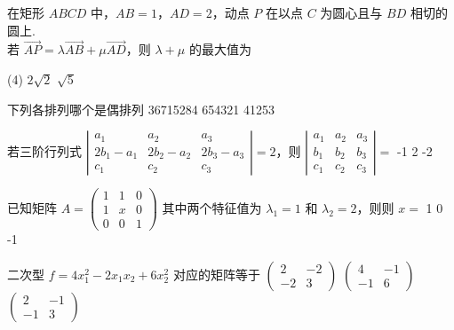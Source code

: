 \begin{question}
在矩形 $ABCD$ 中，$AB=1$，$AD=2$，动点 $P$ 在以点 $C$ 为圆心且与 $BD$ 相切的圆上.\\
	若 $\overrightarrow{{AP}}=\lambda\overrightarrow{{AB} }+\mu\overrightarrow{{AD}}$，则 $\lambda+\mu$ 的最大值为
	\begin{tasks}(4)
		 \task $2\sqrt{2}$ \task $\sqrt{5}$ 
	\end{tasks}
\end{question}

\begin{question}
下列各排列哪个是偶排列 
	{36715284}
	{654321}
	{41253}
\end{question}



\begin{question}
若三阶行列式 $\left|\begin{array}{ccc}
  a_1 & a_2 & a_3\\
  2 b_1 - a_1 & 2 b_2 - a_2 & 2 b_3 - a_3\\
  c_1 & c_2 & c_3
\end{array}\right| = 2$，则 $\left|\begin{array}{ccc}
  a_1 & a_2 & a_3\\
  b_1 & b_2 & b_3\\
  c_1 & c_2 & c_3
\end{array}\right|=$ 
	{-1}
	{2}
	{-2}
\end{question}



\begin{question}
已知矩阵 $A = \left(\begin{array}{ccc}
  1 & 1 & 0\\
  1 & x & 0\\
  0 & 0 & 1
\end{array}\right)$ 其中两个特征值为 $\lambda_1 = 1$ 和 $\lambda_2
= 2$，则则 $x=$ 
	{1}
	{0}
	{-1}
\end{question}


\begin{question}
二次型 $f = 4 x_1^2 - 2 x_1 x_2 + 6 x_2^2$ 对应的矩阵等于 
	{$\left(\begin{array}{cc}
  2 & - 2\\
  - 2 & 3
\end{array}\right)$}
	{$\left(\begin{array}{cc}
  4 & - 1\\
  - 1 & 6
\end{array}\right)$}
	{$\left(\begin{array}{cc}
  2 & - 1\\
  - 1 & 3
\end{array}\right)$}
\end{question}



